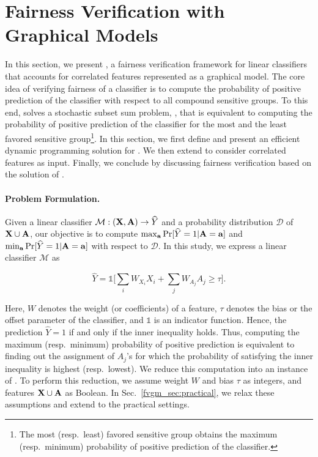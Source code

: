 \section{Fairness Verification with Graphical Models}\label{fvgm_sec:fvgm}

In this section, we present {\fvgm}, a fairness verification framework for linear classifiers that accounts for correlated features represented as a graphical model. The core idea of verifying fairness of a classifier is to compute the probability of positive prediction of the classifier with respect to all compound sensitive groups. To this end, {\fvgm} solves a stochastic subset sum problem, {\stochastic}, that is equivalent to computing the probability of positive prediction of the classifier for the most and the least favored sensitive group\footnote{The most (resp.\ least) favored sensitive group obtains the maximum (resp.\ minimum) probability of positive prediction of the classifier.}. In this section, we first define {\stochastic} and present an efficient dynamic programming solution for {\stochastic}. We then extend {\stochastic} to consider correlated features as input. Finally, we conclude by discussing fairness verification based on the solution of {\stochastic}.


\paragraph{Problem Formulation.}	
Given a linear classifier $ \mathcal{M}: (\mathbf{X}, \mathbf{A}) \rightarrow \widehat{Y} $ and a probability distribution $ \mathcal{D} $ of $ \mathbf{X} \cup \mathbf{A} $, our objective is to compute $ \max_{ \mathbf{a}} \Pr[\widehat{Y} =1 | \mathbf{A} = \mathbf{a}] $ and $ \min_{ \mathbf{a}} \Pr[\widehat{Y} =1 | \mathbf{A} = \mathbf{a}] $ with respect to $ \mathcal{D} $. In this study, we express a linear classifier $\mathcal{M}$ as 

\[	\widehat{Y} = \mathds{1}\Big[\sum_{i} W_{X_i}X_i + \sum_{j} W_{A_j}A_j \ge \tau\Big].\]

Here, $ W $ denotes the weight (or coefficients) of a feature, $ \tau $ denotes the bias or the offset parameter of the classifier, and $\mathds{1}$ is an indicator function. Hence, the prediction $ \widehat{Y} =1 $ if and only if the inner inequality holds.
Thus, computing the maximum (resp.\ minimum) probability of positive prediction is equivalent to finding out the assignment of $A_j$'s for which the probability of satisfying the inner inequality is highest (resp.\ lowest). We reduce this computation into an instance of {\stochastic}. To perform this reduction, we assume  weight $ W $ and bias $ \tau $ as integers, and features $\mathbf{X} \cup \mathbf{A} $ as Boolean. In Sec.~\ref{fvgm_sec:practical}, we relax these assumptions and extend to the practical settings. 

